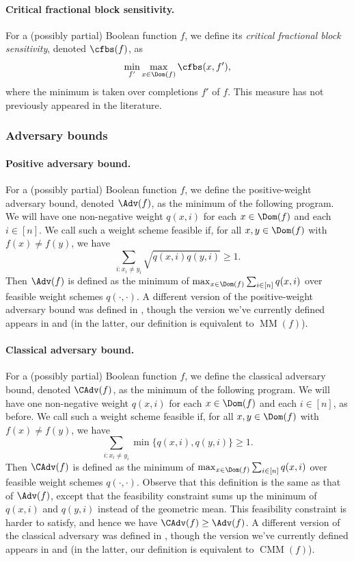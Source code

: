 \paragraph{Critical fractional block sensitivity.}
For a (possibly partial) Boolean function $f$, we define
its \emph{critical fractional block sensitivity}, denoted
$\cfbs(f)$, as
\[\min_{f'}\max_{x\in\Dom(f)}\cfbs(x,f'),\]
where the minimum is taken over completions $f'$ of $f$.
This measure has not previously appeared in the literature.

\subsubsection{Adversary bounds}
\label{sec:prelim_adv}

\paragraph{Positive adversary bound.}
For a (possibly partial) Boolean function $f$,
we define the positive-weight adversary bound,
denoted $\Adv(f)$, as the minimum of the following program.
We will have one non-negative weight $q(x,i)$
for each $x\in\Dom(f)$ and each $i\in[n]$. We call
such a weight scheme feasible if, for all
$x,y\in\Dom(f)$ with $f(x)\ne f(y)$,
we have
\[\sum_{i:x_i\ne y_i} \sqrt{q(x,i)q(y,i)}\ge 1.\]
Then $\Adv(f)$ is defined as the minimum
of $\max_{x\in\Dom(f)}\sum_{i\in[n]} q(x,i)$
over feasible weight schemes $q(\cdot,\cdot)$.
A different version of the positive-weight
adversary bound was defined in \cite{Amb02},
though the version we've currently defined
appears in \cite{LM08} and \cite{SS06}
(in the latter, our definition is equivalent
to $\operatorname{MM}(f)$).

\paragraph{Classical adversary bound.}
For a (possibly partial) Boolean function $f$,
we define the classical adversary bound,
denoted $\CAdv(f)$, as the minimum of the following
program. We will have one non-negative
weight $q(x,i)$ for each $x\in\Dom(f)$ and each $i\in[n]$,
as before. We call such a weight scheme feasible
if, for all $x,y\in\Dom(f)$ with $f(x)\ne f(y)$,
we have
\[\sum_{i:x_i\ne y_i}\min\{q(x,i),q(y,i)\}\ge 1.\]
Then $\CAdv(f)$ is defined as the minimum
of $\max_{x\in\Dom(f)}\sum_{i\in[n]} q(x,i)$
over feasible weight schemes $q(\cdot,\cdot)$.
Observe that this definition is the same as
that of $\Adv(f)$, except that the feasibility
constraint sums up the minimum of $q(x,i)$ and
$q(y,i)$ instead of the geometric mean. This feasibility
constraint is harder to satisfy, and hence we have
$\CAdv(f)\ge\Adv(f)$.
A different version of the classical adversary
was defined in \cite{Aar06}, though the version
we've currently defined appears in \cite{LM08}
and \cite{AKPV18} (in the latter, our definition
is equivalent to $\operatorname{CMM}(f)$).

